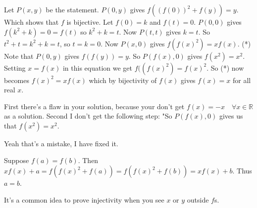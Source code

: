 \begin{solution}
	\begin{tcolorbox}Let $P(x,y)$ be the statement. $P(0,y)$ gives $f((f(0))^2 + f(y) ) = y$. Which shows that $f$ is bijective. Let $f(0) = k$ and $f(t) = 0$. $P(0,0)$ gives $f(k^2 + k) = 0 = f(t)$ so $k^2 + k = t$. Now $P(t,t)$ gives $k=t$. So $t^2 + t = k^2 + k = t$, so $t=k=0$. Now $P(x,0)$ gives $f(f(x)^2 ) = xf(x)$. (*) Note that $P(0,y)$ gives $f(f(y))= y$. So $P(f(x), 0)$ gives $f(x^2) = x^2$. Setting $x= f(x)$ in this equation we get $f( (f(x)^2) = f(x)^2 $. So (*)  now becomes $f(x)^2 = xf(x)$ which by bijectivity of $f(x)$ gives $f(x) = x$ for all real $x$.\end{tcolorbox}

First there's a flaw in your solution, because your don't get $f(x)=-x\quad\forall x\in\mathbb{R}$ as a solution.
Second I don't get the following step: "So $P(f(x),0)$ gives us that $f(x^2)=x^2$.
\end{solution}



\begin{solution}
	Yeah that's a mistake, I have fixed it.
\end{solution}






\begin{solution}
	Suppose $f(a)=f(b)$.
Then $xf(x)+a=f(f(x)^2+f(a))=f(f(x)^2+f(b))=xf(x)+b$.
Thus $a=b$.

It's a common idea to prove injectivity when you see $x$ or $y$ outside $f$s.
\end{solution}



